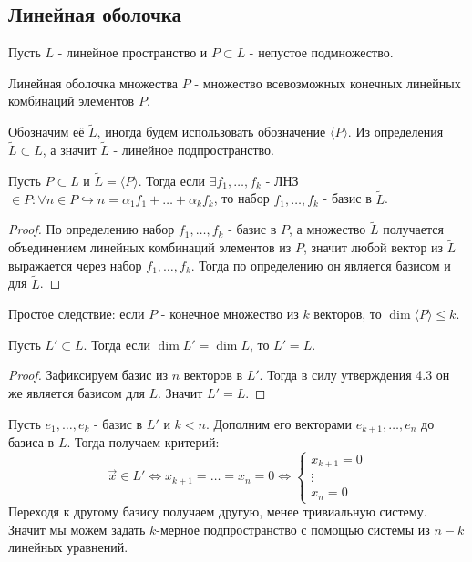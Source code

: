 \subsection{Линейная оболочка}
Пусть $L$ - линейное пространство и $P \subset L$ - непустое подмножество.
\begin{definition}
    Линейная оболочка множества $P$ - множество всевозможных конечных линейных комбинаций элементов $P$.
\end{definition}
Обозначим её $\tilde{L}$, иногда будем использовать обозначение $\langle P\rangle$. Из определения $\tilde{L} \subset L$, а значит $\tilde{L}$ - линейное подпространство.
\begin{theorem}
    Пусть $P \subset L$ и $\tilde{L}=\langle P\rangle$. Тогда если $\exists f_1, \dots, f_k $ - ЛНЗ $\in P:\forall n\in P \hookrightarrow n=\alpha_1 f_1+\dots+\alpha_k f_k$, то набор $f_1, \dots, f_k$ - базис в $\tilde{L}$.
\end{theorem}
\begin{proof}
    По определению набор $f_1, \dots, f_k$ - базис в $P$, а множество $\tilde{L}$ получается объединением линейных комбинаций элементов из $P$, значит любой вектор из $\tilde{L}$ выражается через набор $f_1, \dots, f_k$. Тогда по определению он является базисом и для $\tilde{L}$.
\end{proof}
Простое следствие: если $P$ - конечное множество из $k$ векторов, то $\dim{\langle P}\rangle \leqslant k$.
\begin{proposition}
    Пусть $L' \subset L$. Тогда если $\dim{L}'=\dim{L}$, то $L'=L$.
\end{proposition}
\begin{proof}
    Зафиксируем базис из $n$ векторов в $L'$. Тогда в силу утверждения 4.3 он же является базисом для $L$. Значит $L'=L$.
\end{proof}
Пусть ${e_1}, \dots, {e_k}$ - базис в $L'$ и $k<n$. Дополним его векторами ${e_{k+1}}, \dots, e_n$ до базиса в $L$. Тогда получаем критерий: \[
\vec{x} \in L' \Leftrightarrow x_{k+1}=\dots=x_n=0 \Leftrightarrow\left\{
\begin{array}{ll}
x_{k+1}=0 \\
\vdots\\
x_n=0
\end{array}
\right.
\]
Переходя к другому базису получаем другую, менее тривиальную систему. Значит мы можем задать $k$-мерное подпространство с помощью системы из $n-k$ линейных уравнений.